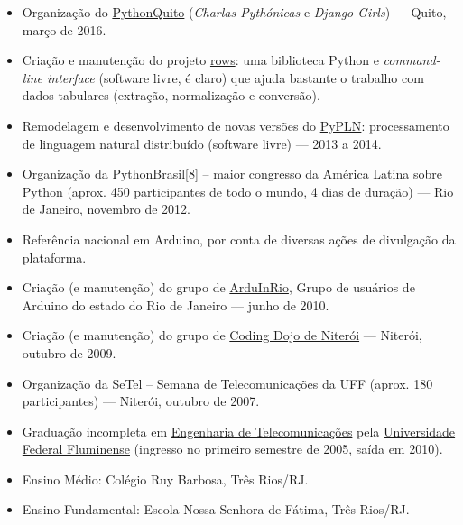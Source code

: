 \documentclass[a4paper,11pt]{article}
\begin{document}
	\begin{itemize}
		\item Organização do \href{http://pythonquito.tk}{PythonQuito}
			(\textit{Charlas Pythónicas} e \textit{Django Girls}) --- Quito,
			março de 2016.
		\item Criação e manutenção do projeto
			\href{https://github.com/turicas/rows}{rows}: uma biblioteca Python
			e \textit{command-line interface} (software livre, é claro) que
			ajuda bastante o trabalho com dados tabulares (extração,
			normalização e conversão).
		\item Remodelagem e desenvolvimento de novas versões do
			\href{http://pypln.org/}{PyPLN}: processamento de linguagem natural
			distribuído (software livre) --- 2013 a 2014.
		\item Organização da
			\href{http://2012.pythonbrasil.org.br/}{PythonBrasil[8]} --
			maior congresso da América Latina sobre Python (aprox. 450
			participantes de todo o mundo, 4 dias de duração) --- Rio de
			Janeiro, novembro de 2012.
		\item Referência nacional em Arduino, por conta de diversas ações de
			divulgação da plataforma.
		\item Criação (e manutenção) do grupo de
			\href{https://groups.google.com/forum/#!forum/arduinrio}{ArduInRio},
			Grupo de usuários de Arduino do estado do Rio de Janeiro --- junho
			de 2010.
		\item Criação (e manutenção) do grupo de
			\href{http://dojorio.org}{Coding Dojo de Niterói} --- Niterói,
			outubro de 2009.
		\item Organização da SeTel -- Semana de Telecomunicações da UFF
			(aprox. 180 participantes) --- Niterói, outubro de 2007.
	 \end{itemize}


	\begin{itemize}
		\item Graduação incompleta em \href{http://telecom.uff.br/}{Engenharia
			de Telecomunicações} pela \href{http://www.uff.br/}{Universidade
			Federal Fluminense} (ingresso no primeiro semestre de 2005, saída
			em 2010).
		\item Ensino Médio: Colégio Ruy Barbosa, Três Rios/RJ.
		\item Ensino Fundamental: Escola Nossa Senhora de Fátima, Três Rios/RJ.
	 \end{itemize}
\end{document}
